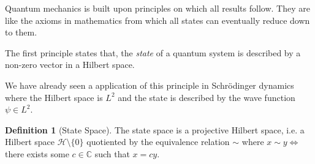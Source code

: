 \documentclass[]{article}
\theoremstyle{definition}
\theoremstyle{definition}
\newtheorem{definition}{Definition}[section]
\begin{document}
Quantum mechanics is built upon principles on which all results follow. They 
are like the axioms in mathematics from which all states can eventually reduce 
down to them.

The first principle states that, the \textit{state} of a quantum system is 
described by a non-zero vector in a Hilbert space.

We have already seen a application of this principle in Schrödinger dynamics 
where the Hilbert space is \(L^2\) and the state is described by the wave 
function \(\psi \in L^2\).

\begin{definition}[State Space]
  The state space is a projective Hilbert space, i.e. a Hilbert space 
  \(\mathcal{H} \setminus \{0\}\) quotiented by the equivalence relation \(\sim\) where 
  \(x \sim y \iff\) there exists some \(c \in \mathbb{C}\) such that 
  \(x = c y\).
\end{definition}
\end{document}
